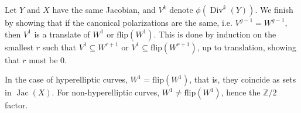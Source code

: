 \documentclass[12pt,reqno]{amsart}
\DeclareMathOperator{\Jac}{Jac}
\DeclareMathOperator{\Div}{Div}
\newcommand{\Z}{\mathbb{Z}}
\newtheorem{theorem}{Theorem}
\theoremstyle{definition}
\theoremstyle{remark}
\newcommand{\ti}{\todo[inline]}
\begin{document}
Let $Y$ and $X$ have the same Jacobian, and $V^{k}$ denote $\phi(\Div^k(Y))$. We finish by showing that if the canonical polarizations are the same, i.e. $V^{g-1} = W^{g-1}$, then $V^1$ is a translate of $W^1$ or $\text{flip}(W^1)$. This is done by induction on the smallest $r$ such that $V^1 \subseteq W^{r+1}$ or $V^1 \subseteq \text{flip}(W^{r+1})$, up to translation, showing that $r$ must be 0.


 In the case of hyperelliptic curves, $W^1 = \text{flip}(W^1)$, that is, they coincide as sets in $\Jac(X)$. For non-hyperelliptic curves, $W^1 \neq \text{flip}(W^1)$, hence the $\Z/2$ factor. 

\end{document}
